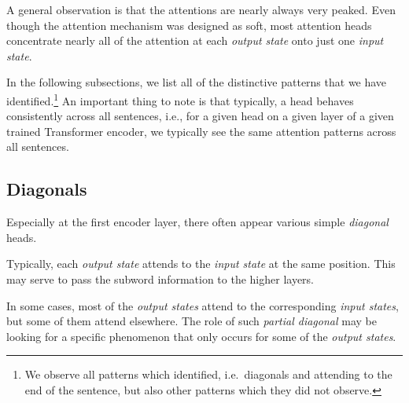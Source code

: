 \documentclass[11pt,a4paper]{article}
\newcommand{\word}{\emph{input state}\xspace}
\newcommand{\words}{\emph{input states}\xspace}
\newcommand{\state}{\emph{output state}\xspace}
\newcommand{\states}{\emph{output states}\xspace}
\def\RR#1{{\color{blue}RR: \it #1}}
\def\DM#1{{\color{red}DM: \it #1}}
\def\JL#1{{\color{magenta}JL: \it #1}}
\def\DEL#1{{\color{green}SMAZAT: \it #1}}
\def\JL#1{}
\def\RR#1{}
\def\DM#1{}
\def\DEL#1{}
\begin{document}
A general observation is that the attentions are nearly always very peaked. Even though the attention mechanism was designed as soft, most attention heads concentrate nearly all of the attention at each \state onto just one \word.

In the following subsections, we list all of the distinctive patterns that we have identified.\footnote{%
We observe all patterns which \citet{raganato:2018} identified, i.e.\ diagonals and attending to the end of the sentence, but also other patterns which they did not observe.}
An important thing to note is that typically, a head behaves consistently across all sentences, i.e., for a given head on a given layer of a given trained Transformer encoder, we typically see the same attention patterns across all sentences.



\subsection{Diagonals}

Especially at the first encoder layer, there often appear various simple \emph{diagonal} heads.

Typically, each \state attends to the \word at the same position.
This may serve
to pass the subword information to the higher layers.

In some cases, most of the \states attend to the corresponding \words, but some of them attend elsewhere. The role of such \emph{partial diagonal} may be looking for a specific phenomenon that only occurs for some of the \states.
\end{document}
